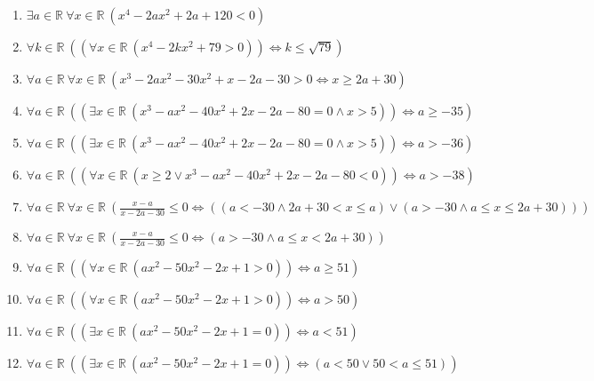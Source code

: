 \documentclass[11pt,a4paper]{article}
\begin{document}
\begin{enumerate}
\item $\displaystyle \exists a \in \mathbb{R}\ \forall x \in \mathbb{R}\ (x^{4} - 2ax^{2} + 2a + 120 < 0)$
\item $\displaystyle \forall k \in \mathbb{R}\ \left( \left( \forall x \in \mathbb{R}\ (x^{4} - 2kx^{2} + 79 > 0) \right) \iff k \le \sqrt{79} \right)$
\item $\displaystyle \forall a \in \mathbb{R}\ \forall x \in \mathbb{R}\ (x^{3} - 2ax^{2} - 30x^{2} + x - 2a - 30 > 0 \iff x \ge 2a + 30)$
\item $\displaystyle \forall a \in \mathbb{R}\ \left( \left( \exists x \in \mathbb{R}\ (x^{3} - ax^{2} - 40x^{2} + 2x - 2a - 80 = 0 \land x > 5) \right) \iff a \ge -35 \right)$
\item $\displaystyle \forall a \in \mathbb{R}\ \left( \left( \exists x \in \mathbb{R}\ (x^{3} - ax^{2} - 40x^{2} + 2x - 2a - 80 = 0 \land x > 5) \right) \iff a > -36 \right)$
\item $\displaystyle \forall a \in \mathbb{R}\ \left( \left( \forall x \in \mathbb{R}\ (x \ge 2 \lor x^{3} - ax^{2} - 40x^{2} + 2x - 2a - 80 < 0) \right) \iff a > -38 \right)$
\item $\displaystyle \forall a \in \mathbb{R}\ \forall x \in \mathbb{R}\ \left( \frac{x - a}{x - 2a - 30} \le 0 \iff \left( (a < -30 \land 2a + 30 < x \le a) \lor (a > -30 \land a \le x \le 2a + 30) \right) \right)$
\item $\displaystyle \forall a \in \mathbb{R}\ \forall x \in \mathbb{R}\ \left( \frac{x - a}{x - 2a - 30} \le 0 \iff (a > -30 \land a \le x < 2a + 30) \right)$
\item $\displaystyle \forall a \in \mathbb{R}\ \left( \left( \forall x \in \mathbb{R}\ (ax^{2} - 50x^{2} - 2x + 1 > 0) \right) \iff a \ge 51 \right)$
\item $\displaystyle \forall a \in \mathbb{R}\ \left( \left( \forall x \in \mathbb{R}\ (ax^{2} - 50x^{2} - 2x + 1 > 0) \right) \iff a > 50 \right)$
\item $\displaystyle \forall a \in \mathbb{R}\ \left( \left( \exists x \in \mathbb{R}\ (ax^{2} - 50x^{2} - 2x + 1 = 0) \right) \iff a < 51 \right)$
\item $\displaystyle \forall a \in \mathbb{R}\ \left( \left( \exists x \in \mathbb{R}\ (ax^{2} - 50x^{2} - 2x + 1 = 0) \right) \iff (a < 50 \lor 50 < a \le 51) \right)$
\end{enumerate}
\end{document}
